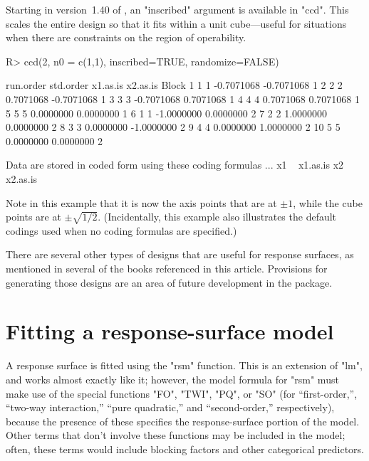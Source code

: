 \documentclass[article,nojss]{jss}
\def\rsm{\pkg{rsm}}
\begin{document}
Starting in version~1.40 of \rsm{}, an "inscribed" argument is available in "ccd".  This scales the entire design so that it fits within a unit cube---useful for situations when there are constraints on the region of operability.
\begin{Schunk}
\begin{Sinput}
R> ccd(2, n0 = c(1,1), inscribed=TRUE, randomize=FALSE)
\end{Sinput}
\begin{Soutput}
   run.order std.order   x1.as.is   x2.as.is Block
1          1         1 -0.7071068 -0.7071068     1
2          2         2  0.7071068 -0.7071068     1
3          3         3 -0.7071068  0.7071068     1
4          4         4  0.7071068  0.7071068     1
5          5         5  0.0000000  0.0000000     1
6          1         1 -1.0000000  0.0000000     2
7          2         2  1.0000000  0.0000000     2
8          3         3  0.0000000 -1.0000000     2
9          4         4  0.0000000  1.0000000     2
10         5         5  0.0000000  0.0000000     2

Data are stored in coded form using these coding formulas ...
x1 ~ x1.as.is
x2 ~ x2.as.is
\end{Soutput}
\end{Schunk}
Note in this example that it is now the axis points that are at $\pm1$, while the cube points are at $\pm\sqrt{1/2}$. (Incidentally, this example also illustrates the default codings used when no coding formulas are specified.)

There are several other types of designs that are useful for response surfaces, as mentioned in several of the books referenced in this article.  Provisions for generating those designs are an area of future development in the \rsm{} package.



\section{Fitting a response-surface model}\label{fitting}
A response surface is fitted using the "rsm" function.  This is an extension of "lm", and works almost exactly like it; however, the model formula for "rsm" must make use of the special functions "FO", "TWI", "PQ", or "SO" (for ``first-order,'', ``two-way interaction,'' ``pure quadratic,'' and ``second-order,'' respectively), because the presence of these specifies the response-surface portion of the model.  Other terms that don't involve these functions may be included in the model; often, these terms would include blocking factors and other categorical predictors.
\end{document}
